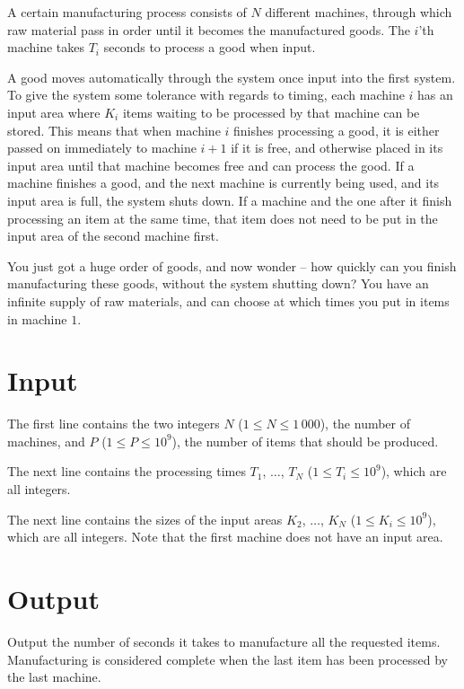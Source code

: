 A certain manufacturing process consists of $N$ different machines, through which raw material pass in order until it becomes the manufactured goods.
The $i$'th machine takes $T_i$ seconds to process a good when input.

A good moves automatically through the system once input into the first system.
To give the system some tolerance with regards to timing, each machine $i$ has an input area where $K_i$ items waiting to be processed by that machine can be stored.
This means that when machine $i$ finishes processing a good, it is either passed on immediately to machine $i + 1$ if it is free, and otherwise placed in its input area until that machine becomes free and can process the good.
If a machine finishes a good, and the next machine is currently being used, and its input area is full, the system shuts down.
If a machine and the one after it finish processing an item at the same time, that item does not need to be put in the input area of the second machine first.

You just got a huge order of goods, and now wonder -- how quickly can you finish manufacturing these goods, without the system shutting down?
You have an infinite supply of raw materials, and can choose at which times you put in items in machine $1$.

\section*{Input}
The first line contains the two integers $N$ ($1 \le N \le 1\,000$), the number of machines, and $P$ ($1 \le P \le 10^9$), the number of items that should be produced.

The next line contains the processing times $T_1$, $\dots$, $T_N$ ($1 \le T_i \le 10^9$), which are all integers.

The next line contains the sizes of the input areas $K_2$, $\dots$, $K_N$ ($1 \le K_i \le 10^9$), which are all integers.
Note that the first machine does not have an input area.

\section*{Output}
Output the number of seconds it takes to manufacture all the requested items.
Manufacturing is considered complete when the last item has been processed by the last machine.
